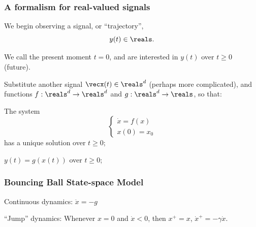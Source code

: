 \documentclass[12pt]{beamer}
\begin{document}
\begin{frame}
\frametitle{A formalism for real-valued signals}

\begin{itemize}
\vitem We begin observing a signal, or ``trajectory'',
\[
y(t) \in \reals.
\]

\vitem We call the present moment $t=0$, and are interested in $y(t)$ over $t \geq 0$ (future).


\vitem Substitute another signal $\vecx(t) \in \reals^d$ (perhaps more complicated), and functions $f : \reals^d \to \reals^d$ and $g : \reals^d \to \reals$, so that:

\begin{enumerate}
\vitem The system
\[
\begin{cases}
	\dot x = f(x) \\
	x(0) = x_0
\end{cases}
\]
has a unique solution over $t \geq 0$;

\vitem $y(t) = g( x(t) )$ over $t \geq 0$;


\end{enumerate}

\end{itemize}

\vfill\null
\end{frame}



\begin{frame}
\frametitle{Bouncing Ball State-space Model}

Continuous dynamics: $\ddot x = -g$

``Jump'' dynamics: Whenever $x = 0$ and $\dot x < 0$, then
$x^+ = x$, $\dot x^+ = -\gamma \dot x$.

\end{frame}
\end{document}
